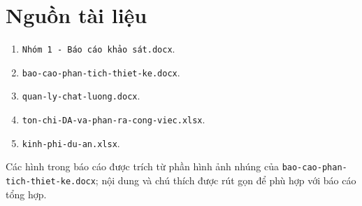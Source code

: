 \documentclass[12pt,a4paper]{report}
\begin{document}
\chapter{Nguồn tài liệu}

\begin{enumerate}
\item \texttt{Nhóm 1 - Báo cáo khảo sát.docx}.
\item \texttt{bao-cao-phan-tich-thiet-ke.docx}.
\item \texttt{quan-ly-chat-luong.docx}.
\item \texttt{ton-chi-DA-va-phan-ra-cong-viec.xlsx}.
\item \texttt{kinh-phi-du-an.xlsx}.
\end{enumerate}

\noindent Các hình trong báo cáo được trích từ phần hình ảnh nhúng của \texttt{bao-cao-phan-tich-thiet-ke.docx}; nội dung và chú thích được rút gọn để phù hợp với báo cáo tổng hợp.
\end{document}
